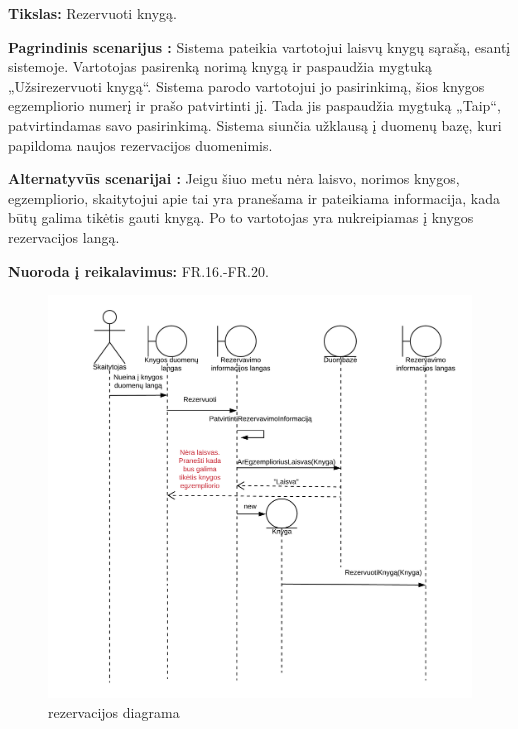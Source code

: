\documentclass{VUMIFPSkursinis}
\begin{document}
	\textbf{Tikslas:} Rezervuoti knygą.

	\textbf{Pagrindinis scenarijus :} Sistema pateikia vartotojui laisvų knygų sąrašą, esantį sistemoje. Vartotojas pasirenką norimą knygą ir paspaudžia mygtuką „Užsirezervuoti knygą“. Sistema parodo vartotojui jo pasirinkimą, šios knygos egzempliorio numerį ir prašo patvirtinti jį. Tada jis paspaudžia mygtuką „Taip“, patvirtindamas savo pasirinkimą. Sistema siunčia užklausą į duomenų bazę, kuri papildoma naujos rezervacijos duomenimis.
    
	\textbf{Alternatyvūs scenarijai :} Jeigu šiuo metu nėra laisvo, norimos knygos, egzempliorio, skaitytojui apie tai yra pranešama ir pateikiama informacija, kada būtų galima tikėtis gauti knygą. Po to vartotojas yra nukreipiamas į knygos rezervacijos langą.

	\textbf{Nuoroda į reikalavimus:} FR.16.-FR.20.
    
\begin{figure}[H]
\label{fig:rezervdiag}
    \centering
    \includegraphics[width=1\textwidth]{Sekos_diagramos/SD_KRezervacija}
	\caption{rezervacijos diagrama}
\end{figure}
\end{document}
